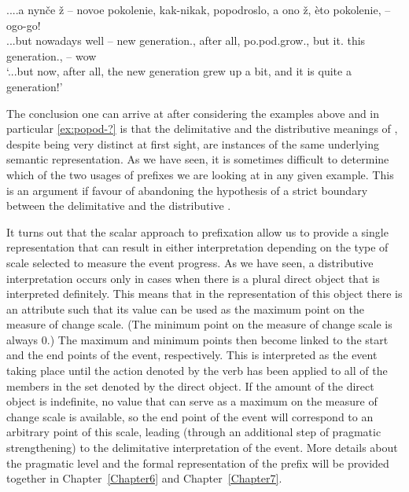 \exg.\label{ex:popod-?}...a nyn\v{c}e \v{z} – novoe pokolenie, kak-nikak, popodroslo, a ono \v{z}, \`{e}to pokolenie, -- ogo-go!\\
...but nowadays well -- new generation., {after all}, po.pod.grow., but it. {} this generation., -- wow
\\
\trans `...but now, after all, the new generation grew up a bit, and it is quite a generation!'
 
The conclusion one can arrive at after considering the examples above and in particular \ref{ex:popod-?} is that the delimitative and the distributive meanings of , despite being very distinct at first sight, are instances of the same underlying semantic representation. As we have seen, it is sometimes difficult to determine which of the two usages of prefixes we are looking at in any given example. This is an argument if favour of abandoning the hypothesis of a strict boundary between the delimitative  and the distributive .

It turns out that the scalar approach to prefixation allow us to provide a single representation that can result in either interpretation depending on the type of scale selected to measure the event progress. As we have seen, a distributive interpretation occurs only in cases when there is a plural direct object that is interpreted definitely. This means that in the representation of this object there is an attribute such that its value can be used as the maximum point on the measure of change scale. (The minimum point on the measure of change scale is always 0.) The maximum and minimum points then become linked to the start and the end points of the event, respectively. This is interpreted as the event taking place until the action denoted by the verb has been applied to all of the members in the set denoted by the direct object. If the amount of the direct object is indefinite, no value that can serve as a maximum on the measure of change scale is available, so the end point of the event will correspond to an arbitrary point of this scale, leading (through an additional step of pragmatic strengthening) to the delimitative interpretation of the event. More details about the pragmatic level and the formal representation of the prefix will be provided together in Chapter~\ref{Chapter6} and Chapter~\ref{Chapter7}.

